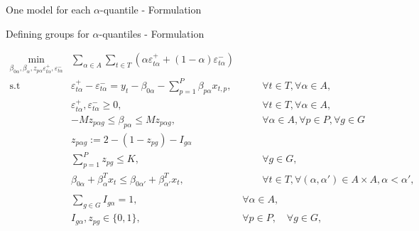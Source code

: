 \documentclass[ignorenonframetext,]{beamer}
\begin{document}
\begin{frame}{One model for each \(\alpha\)-quantile - Formulation}
\end{frame}

\begin{frame}{Defining groups for \(\alpha\)-quantiles - Formulation}

\tiny

\begin{eqnarray}
 \underset{\beta_{0\alpha},\beta_\alpha,z_{p \alpha} \varepsilon_{t \alpha}^{+},\varepsilon_{t \alpha}^{-}}{\text{min}} & \sum_{\alpha \in A} \sum_{t\in T}\left(\alpha\varepsilon_{t \alpha}^{+}+(1-\alpha)\varepsilon_{t\alpha}^{-}\right) \label{eq:mip0} \\
\mbox{s.t } & \varepsilon_{t \alpha}^{+}-\varepsilon_{t \alpha}^{-}=y_{t}-\beta_{0 \alpha}-\sum_{p=1}^{P}\beta_{p \alpha}x_{t,p},& \qquad\forall t \in T ,\forall \alpha \in A, \label{eq:mip1}\\
& \varepsilon_{t \alpha}^{+},\varepsilon_{t \alpha}^{-}\geq0,&\qquad\forall t \in T ,\forall \alpha \in A, \label{eq:mip2}\\
& - M z_{p \alpha g} \leq \beta_{p \alpha} \leq M z_{p \alpha g},&\qquad \forall \alpha \in A, \forall p\in P, \forall g \in G \label{eq:mip3}\\
&z_{p \alpha g} := 2 - ( 1-z_{pg}) - I_{g\alpha}& \label{mipgrupzpa} \\
& \sum_{p=1}^P z_{p g} \leq K, & \qquad \forall g \in G, \label{eq:mip4}\\
& \beta_{0\alpha} + \beta_{\alpha}^T x_{t} \leq \beta_{0\alpha'} + \beta_{\alpha'}^T x_{t}, & \qquad \forall t \in T, \forall (\alpha, \alpha') \in A \times A,  \alpha < \alpha',\nonumber\\ \label{eq:mip6} \\
& \sum\limits_{g \in G} I_{g\alpha} = 1, & \forall \alpha \in A,\label{eq:mipgrupa} \\
& I_{g\alpha}, z_{pg} \in \{0,1\},& \forall p \in P, \quad \forall g \in G, 
\end{eqnarray}

\end{frame}
\end{document}

